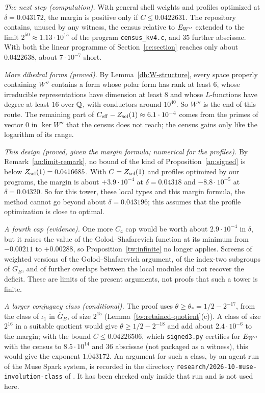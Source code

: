 \emph{The next step (computation).} With general shell weights and
profiles optimized at $\delta=0.043172$, the margin is positive only if
$C\le0.0422631$. The repository contains, unused by any witness, the census
relative to $E_{W''}$ extended to the limit $2^{50}\approx1.13\cdot10^{15}$ of the
program \texttt{census\_kv4.c}, and $35$ further abscissae. With both the linear programme of
Section~\ref{ce:section} reaches only about $0.0422638$, about $7\cdot10^{-7}$
short.

\emph{More dihedral forms (proved).} By Lemma~\ref{dh:W-structure}, every
space properly containing $W''$ contains a form whose polar form has rank at
least $6$, whose irreducible representations have dimension at least $8$ and
whose $L$-functions have degree at least $16$ over $\mathbb Q$, with conductors
around $10^{40}$. So $W''$ is the end of this route. The remaining part of
$C_{\rm eff}-Z_{\rm sel}(1)\approx6.1\cdot10^{-4}$ comes from the primes of
vector $0$ in $\ker W''$ that the census does not reach; the census gains only
like the logarithm of its range.

\emph{This design (proved, given the margin formula; numerical for the
profiles).} By Remark~\ref{an:limit-remark}, no bound of the kind of
Proposition~\ref{an:signed} is below $Z_{\rm sel}(1)=0.0416685$. With
$C=Z_{\rm sel}(1)$ and profiles optimized by our programs, the margin is about
$+3.9\cdot10^{-4}$ at $\delta=0.04318$ and $-8.8\cdot10^{-5}$ at
$\delta=0.04320$. So for this tower, these local types and this margin formula,
the method cannot go beyond about $\delta=0.043196$; this assumes that the
profile optimization is close to optimal.

\emph{A fourth cap (evidence).} One more $C_4$ cap would be worth about
$2.9\cdot10^{-4}$ in $\delta$, but it raises the value of the
Golod--Shafarevich function at its minimum from $-0.00211$ to $+0.00288$, so
Proposition~\ref{tw:infinite} no longer applies. Screens of weighted versions
of the Golod--Shafarevich argument, of the index-two subgroups of $G_B$, and
of further overlaps between the local modules did not recover the deficit.
These are limits of the present arguments, not proofs that such a tower is
finite.

\emph{A larger conjugacy class (conditional).} The proof uses
$\theta\ge\theta_*=1/2-2^{-17}$, from the class of $\iota_1$ in
$\overline G_B$, of size $2^{15}$ (Lemma~\ref{tw:retained-quotient}(c)). A class of
size $2^{16}$ in a suitable quotient would give $\theta\ge1/2-2^{-18}$ and add
about $2.4\cdot10^{-6}$ to the margin; with the bound $C\le0.04226506$, which
\texttt{signed3.py} certifies for $E_{W''}$ with the census to $8.5\cdot10^{14}$ and
$36$ abscissae (not packaged as a witness), this would give the exponent
$1.043172$. An argument for such a class, by an agent run of the Muse Spark
system, is recorded in the directory \texttt{research/2026-10-muse-involution-class}
of \cite{NaslundCode4317}. It has been checked only inside that run and is not
used here.
